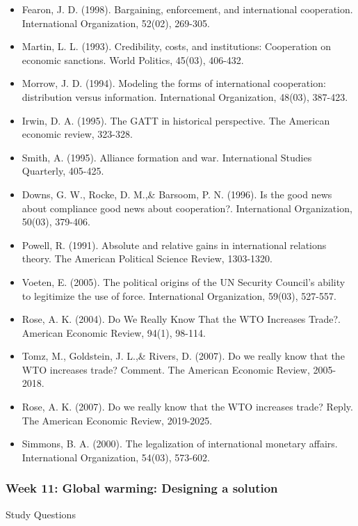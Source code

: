 \documentclass[12pt,a4paper]{article}
\begin{document}
\begin{itemize}
	\item Fearon, J. D. (1998). Bargaining, enforcement, and international cooperation. International Organization, 52(02), 269-305.
	
	\item Martin, L. L. (1993). Credibility, costs, and institutions: Cooperation on economic sanctions. World Politics, 45(03), 406-432.
	\item Morrow, J. D. (1994). Modeling the forms of international cooperation: distribution versus information. International Organization, 48(03), 387-423.
	\item Irwin, D. A. (1995). The GATT in historical perspective. The American economic review, 323-328.
	\item Smith, A. (1995). Alliance formation and war. International Studies Quarterly, 405-425. 
	\item Downs, G. W., Rocke, D. M.,\& Barsoom, P. N. (1996). Is the good news about compliance good news about cooperation?. International Organization, 50(03), 379-406.
	\item Powell, R. (1991). Absolute and relative gains in international relations theory. The American Political Science Review, 1303-1320.
	\item Voeten, E. (2005). The political origins of the UN Security Council's ability to legitimize the use of force. International Organization, 59(03), 527-557.
	\item Rose, A. K. (2004). Do We Really Know That the WTO Increases Trade?. American Economic Review, 94(1), 98-114.
	\item Tomz, M., Goldstein, J. L.,\& Rivers, D. (2007). Do we really know that the WTO increases trade? Comment. The American Economic Review, 2005-2018.
	\item Rose, A. K. (2007). Do we really know that the WTO increases trade? Reply. The American Economic Review, 2019-2025.
	\item Simmons, B. A. (2000). The legalization of international monetary affairs. International Organization, 54(03), 573-602.
\end{itemize}
	
\subsubsection*{Week 11: Global warming: Designing a solution}

Study Questions
\end{document}
